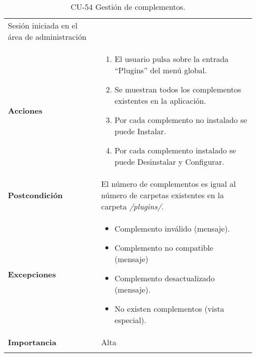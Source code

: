 \begin{longtable}[]{@{}ll@{}}
\begin{minipage}[t]{0.73\columnwidth}
Sesión iniciada en el área de administración\strut
\end{minipage}\tabularnewline
\begin{minipage}[t]{0.21\columnwidth}\raggedright
\textbf{Acciones}\strut
\end{minipage} & \begin{minipage}[t]{0.73\columnwidth}\raggedright
\begin{enumerate}
\def\labelenumi{\arabic{enumi}.}
\tightlist
\item
  El usuario pulsa sobre la entrada ``Plugins'' del menú global.
\item
  Se muestran todos los complementos existentes en la aplicación.
\item
  Por cada complemento no instalado se puede Instalar.
\item
  Por cada complemento instalado se puede Desinstalar y Configurar.
\end{enumerate}\strut
\end{minipage}\tabularnewline
\begin{minipage}[t]{0.21\columnwidth}\raggedright
\textbf{Postcondición}\strut
\end{minipage} & \begin{minipage}[t]{0.73\columnwidth}\raggedright
El número de complementos es igual al número de carpetas existentes en
la carpeta \emph{/plugins/}.\strut
\end{minipage}\tabularnewline
\begin{minipage}[t]{0.21\columnwidth}\raggedright
\textbf{Excepciones}\strut
\end{minipage} & \begin{minipage}[t]{0.73\columnwidth}\raggedright
\begin{itemize}
\tightlist
\item
  Complemento inválido (mensaje).
\item
  Complemento no compatible (mensaje)
\item
  Complemento desactualizado (mensaje).
\item
  No existen complementos (vista especial).
\end{itemize}\strut
\end{minipage}\tabularnewline
\begin{minipage}[t]{0.21\columnwidth}\raggedright
\textbf{Importancia}\strut
\end{minipage} & \begin{minipage}[t]{0.73\columnwidth}\raggedright
Alta\strut
\end{minipage}\tabularnewline
\bottomrule
\caption{CU-54 Gestión de complementos.}
\end{longtable}


